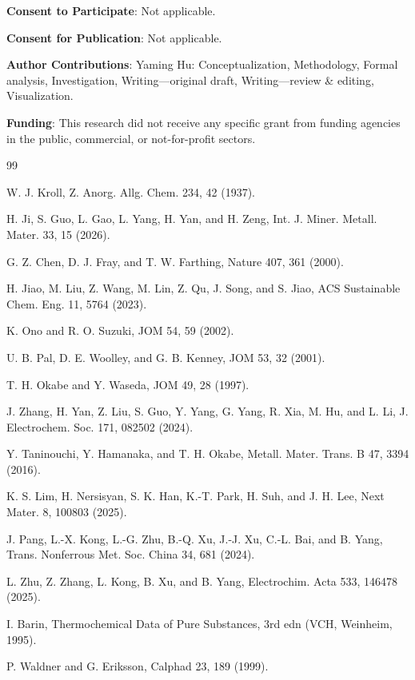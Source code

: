\documentclass[11pt]{article}
\begin{document}
\noindent\textbf{Consent to Participate}: Not applicable.

\noindent\textbf{Consent for Publication}: Not applicable.

\noindent\textbf{Author Contributions}: Yaming Hu: Conceptualization, Methodology, Formal analysis, Investigation, Writing---original draft, Writing---review \& editing, Visualization.

\noindent\textbf{Funding}: This research did not receive any specific grant from funding agencies in the public, commercial, or not-for-profit sectors.

\begin{thebibliography}{99}

 W. J. Kroll, Z. Anorg. Allg. Chem. 234, 42 (1937).

 H. Ji, S. Guo, L. Gao, L. Yang, H. Yan, and H. Zeng, Int. J. Miner. Metall. Mater. 33, 15 (2026).

 G. Z. Chen, D. J. Fray, and T. W. Farthing, Nature 407, 361 (2000).

 H. Jiao, M. Liu, Z. Wang, M. Lin, Z. Qu, J. Song, and S. Jiao, ACS Sustainable Chem. Eng. 11, 5764 (2023).

 K. Ono and R. O. Suzuki, JOM 54, 59 (2002).

 U. B. Pal, D. E. Woolley, and G. B. Kenney, JOM 53, 32 (2001).

 T. H. Okabe and Y. Waseda, JOM 49, 28 (1997).

 J. Zhang, H. Yan, Z. Liu, S. Guo, Y. Yang, G. Yang, R. Xia, M. Hu, and L. Li, J. Electrochem. Soc. 171, 082502 (2024).

 Y. Taninouchi, Y. Hamanaka, and T. H. Okabe, Metall. Mater. Trans. B 47, 3394 (2016).

 K. S. Lim, H. Nersisyan, S. K. Han, K.-T. Park, H. Suh, and J. H. Lee, Next Mater. 8, 100803 (2025).

 J. Pang, L.-X. Kong, L.-G. Zhu, B.-Q. Xu, J.-J. Xu, C.-L. Bai, and B. Yang, Trans. Nonferrous Met. Soc. China 34, 681 (2024).

 L. Zhu, Z. Zhang, L. Kong, B. Xu, and B. Yang, Electrochim. Acta 533, 146478 (2025).

 I. Barin, Thermochemical Data of Pure Substances, 3rd edn (VCH, Weinheim, 1995).

 P. Waldner and G. Eriksson, Calphad 23, 189 (1999).


\end{thebibliography}
\end{document}
